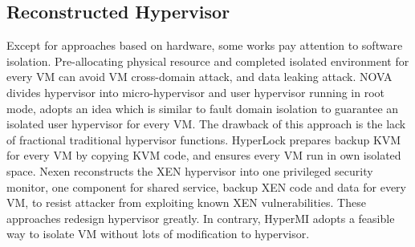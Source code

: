 \documentclass[conference]{IEEEtran}
\begin{document}
\subsection{Reconstructed Hypervisor }
Except for approaches based on hardware, some works\cite{nexen,Steinberg2010NOVA,hyperlock} pay attention to software isolation. Pre-allocating physical resource and completed isolated environment for every VM can avoid VM cross-domain attack, and data leaking attack. NOVA\cite{Steinberg2010NOVA} divides hypervisor into micro-hypervisor and user hypervisor running in root mode, adopts an idea which is similar to fault domain isolation to guarantee an isolated user hypervisor for every VM. The drawback of this approach is the lack of fractional traditional hypervisor functions. HyperLock \cite{hyperlock} prepares backup KVM for every VM by copying KVM code, and ensures every VM run in own isolated space. Nexen\cite{nexen} reconstructs the XEN hypervisor into one privileged security monitor, one component for shared service, backup XEN code and data for every VM, to resist attacker from exploiting known XEN vulnerabilities. These approaches redesign hypervisor greatly. In contrary, HyperMI adopts a feasible way to isolate VM without lots of modification to hypervisor. 
\end{document}
